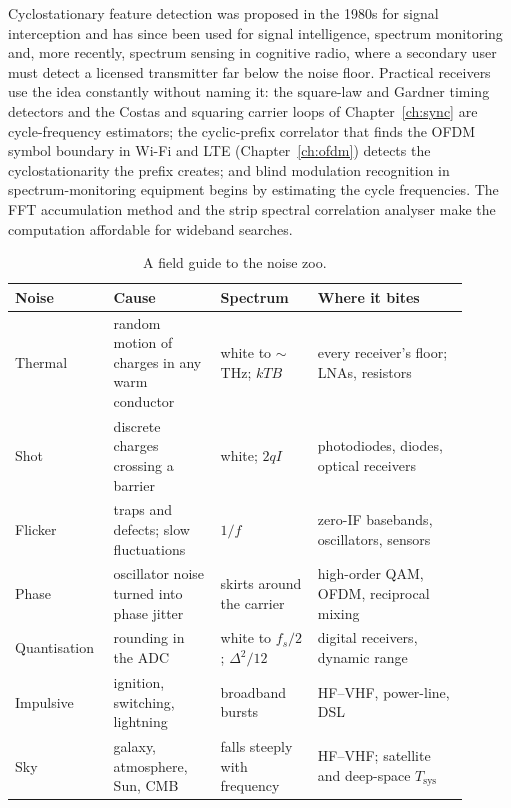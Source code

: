 \begin{inpractice}
Cyclostationary feature detection was proposed in the 1980s for signal interception and has since been
used for signal intelligence, spectrum monitoring and, more recently, spectrum sensing in cognitive
radio, where a secondary user must detect a licensed transmitter far below the noise floor. Practical
receivers use the idea constantly without naming it: the square-law and Gardner timing detectors and
the Costas and squaring carrier loops of Chapter~\ref{ch:sync} are cycle-frequency estimators; the
cyclic-prefix correlator that finds the OFDM symbol boundary in Wi-Fi and LTE (Chapter~\ref{ch:ofdm})
detects the cyclostationarity the prefix creates; and blind modulation recognition in
spectrum-monitoring equipment begins by estimating the cycle frequencies. The FFT accumulation method
and the strip spectral correlation analyser make the computation affordable for wideband searches.
\end{inpractice}

\begin{table}[htbp]\centering\small
\caption{A field guide to the noise zoo.}
\label{tab:ch03:zoo}
\begin{tabular}{@{}>{\raggedright\arraybackslash}p{0.17\linewidth}>{\raggedright\arraybackslash}p{0.22\linewidth}>{\raggedright\arraybackslash}p{0.2\linewidth}>{\raggedright\arraybackslash}p{0.31\linewidth}@{}}
\toprule
Noise & Cause & Spectrum & Where it bites\\
\midrule
Thermal & random motion of charges in any warm conductor & white to $\sim$THz; $kTB$ & every receiver's floor; LNAs, resistors\\
Shot & discrete charges crossing a barrier & white; $2qI$ & photodiodes, diodes, optical receivers\\
Flicker & traps and defects; slow fluctuations & $1/f$ & zero-IF basebands, oscillators, sensors\\
Phase & oscillator noise turned into phase jitter & skirts around the carrier & high-order QAM, OFDM, reciprocal mixing\\
Quantisation & rounding in the ADC & white to $f_s/2$; $\Delta^2/12$ & digital receivers, dynamic range\\
Impulsive & ignition, switching, lightning & broadband bursts & HF--VHF, power-line, DSL\\
Sky & galaxy, atmosphere, Sun, CMB & falls steeply with frequency & HF--VHF; satellite and deep-space $T_{\text{sys}}$\\
\bottomrule
\end{tabular}
\end{table}

